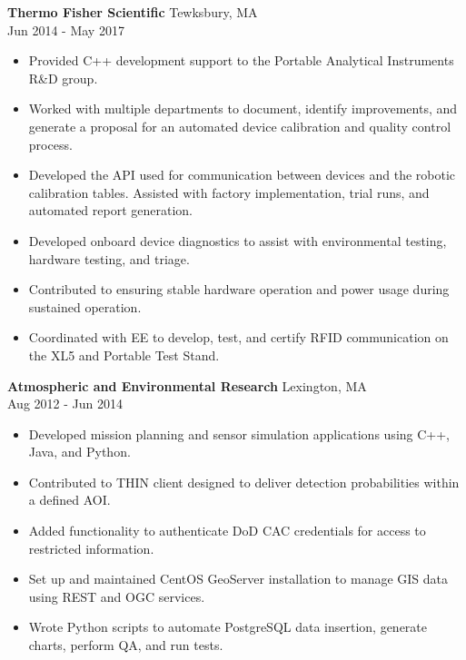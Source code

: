\documentclass[10pt]{article}
\newcommand{\verticalspace}{\vspace{2.0mm}}
\begin{document}
\verticalspace

{\bf Thermo Fisher Scientific} \hfill Tewksbury, MA \\
 \hfill Jun 2014 - May 2017
\begin{itemize}
\item Provided C++ development support to the Portable Analytical Instruments R\&D group.

\item Worked with multiple departments to document, identify improvements, and generate a proposal for an automated device calibration and quality control process.
\item Developed the API used for communication between devices and the robotic calibration tables.  Assisted with factory implementation, trial runs, and automated report generation.
\item Developed onboard device diagnostics to assist with environmental testing, hardware testing, and triage.
\item Contributed to ensuring stable hardware operation and power usage during sustained operation.
\item Coordinated with EE to develop, test, and certify RFID communication on the XL5 and Portable Test Stand. 
\end{itemize}

\verticalspace

{\bf Atmospheric and Environmental Research} \hfill Lexington, MA \\
 \hfill Aug 2012 - Jun 2014
\begin{itemize}
\item Developed mission planning and sensor simulation applications using C++, Java, and Python.
\item Contributed to THIN client designed to deliver detection probabilities within a defined AOI.
\item Added functionality to authenticate DoD CAC credentials for access to restricted information.
\item Set up and maintained CentOS GeoServer installation to manage GIS data using REST and OGC services.
\item Wrote Python scripts to automate PostgreSQL data insertion, generate charts, perform QA, and run tests.
\end{itemize}

\verticalspace
\end{document}
